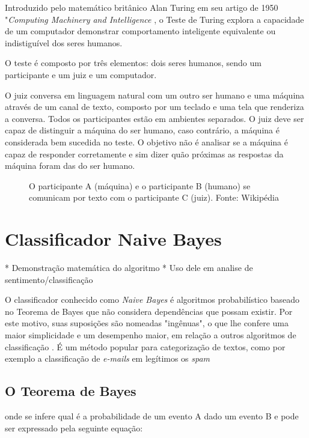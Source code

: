 Introduzido pelo matemático britânico Alan Turing em seu artigo de 1950 "\textit{Computing Machinery and Intelligence} \cite{turing1950computing}, o Teste de Turing explora a capacidade de um computador demonstrar comportamento inteligente equivalente ou indistiguível dos seres humanos.

O teste é composto por três elementos: dois seres humanos, sendo um participante e um juiz e um computador.

O juiz conversa em linguagem natural com um outro ser humano e uma máquina através de um canal de texto, composto por um teclado e uma tela que renderiza a conversa. Todos os participantes estão em ambientes separados. O juiz deve ser capaz de distinguir a máquina do ser humano, caso contrário, a máquina é considerada bem sucedida no teste. O objetivo não é analisar se a máquina é capaz de responder corretamente e sim dizer quão próximas as respostas da máquina foram das do ser humano.  

\begin{figure}[!h]
	\centering{}
	\caption{O participante A (máquina) e o participante B (humano) se comunicam por texto com o participante C (juiz). Fonte: Wikipédia}
	\label{uni}
\end{figure}


\section{Classificador Naive Bayes}\label{sec:naive_bayes}
* Demonstração matemática do algoritmo
* Uso dele em analise de sentimento/classificação


O classificador conhecido como \textit{Naive Bayes} é algoritmos probabilístico baseado no Teorema de Bayes que não considera dependências que possam existir. Por este motivo, suas suposições são nomeadas "ingênuas", o que lhe confere uma maior simplicidade e um desempenho maior, em relação a outros algoritmos de classificação \cite{rennie2003tackling}. É um método popular para categorização de textos, como por exemplo a classificação de \textit{e-mails} em legítimos os \textit{spam} \cite{androutsopoulos2000evaluation}

\subsection{O Teorema de Bayes}

onde se infere qual é a probabilidade de um evento A dado um evento B e pode ser expressado pela seguinte equação:

